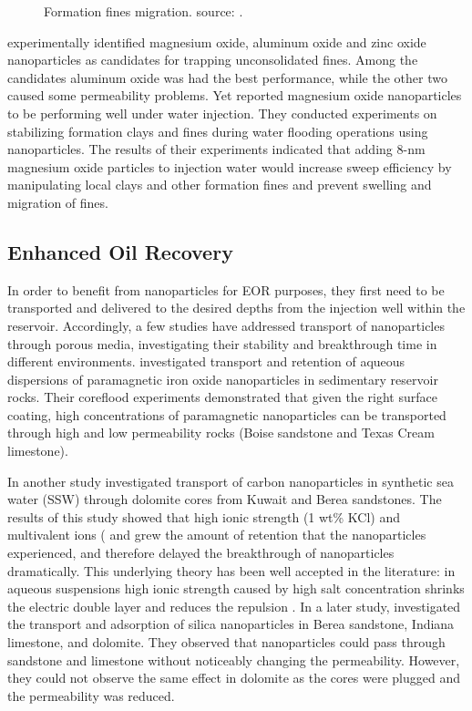 \begin{figure}[p]
    \caption{Formation fines migration. source: \citet{Huang2008}.}
    \label{fig:fines}
\end{figure}

\citet{Ogolo2013} experimentally identified magnesium oxide, aluminum oxide and zinc oxide nanoparticles as candidates for trapping unconsolidated fines. Among the candidates aluminum oxide was had the best performance, while the other two caused some permeability problems. Yet \citet{Huang2015} reported magnesium oxide nanoparticles to be performing well under water injection. They conducted experiments on stabilizing formation clays and fines during water flooding operations using nanoparticles. The results of their experiments indicated that adding 8-nm magnesium oxide particles to injection water would increase sweep efficiency by manipulating local clays and other formation fines and prevent swelling and migration of fines. 

\subsection{Enhanced Oil Recovery}
In order to benefit from nanoparticles for EOR purposes, they first need to be transported and delivered to the desired depths from the injection well within the reservoir. Accordingly, a few studies have addressed transport of nanoparticles through porous media, investigating their stability and breakthrough time in different environments. \citet{Yu2010} investigated transport and retention of aqueous dispersions of paramagnetic iron oxide nanoparticles in sedimentary reservoir rocks. Their coreflood experiments demonstrated that given the right surface coating, high concentrations of paramagnetic nanoparticles can be transported through high and low permeability rocks (Boise sandstone and Texas Cream limestone). 

In another study \citet{Yu2010a} investigated transport of carbon nanoparticles in synthetic sea water (SSW) through dolomite cores from Kuwait and Berea sandstones. The results of this study showed that high ionic strength (1 wt\% KCl) and multivalent ions ( and  grew the amount of retention that the nanoparticles experienced, and therefore delayed the breakthrough of nanoparticles dramatically. This underlying theory has been well accepted in the literature: in aqueous suspensions high ionic strength caused by high salt concentration shrinks the electric double layer and reduces the repulsion \citep{Goodwin2009, Tadros2013}. In a later study, \citet{Yu2012}investigated the transport and adsorption of silica nanoparticles in Berea sandstone, Indiana limestone, and dolomite. They observed that nanoparticles could pass through sandstone and limestone without noticeably changing the permeability. However, they could not observe the same effect in dolomite as the cores were plugged and the permeability was reduced. 

